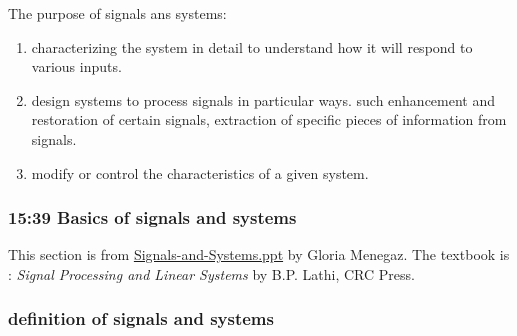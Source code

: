 \documentclass[koma,utopia,letterpaper,captions=tableheading,11pt,listings-sv,microtype,paralist,colorlinks=true,urlcolor=blue]{org-article}
\begin{document}
The purpose of signals ans systems:
\begin{enumerate}
\item characterizing the system in detail to understand how it will respond to
various inputs.
\item design systems to process signals in particular ways. such enhancement and
restoration of certain signals, extraction of specific pieces of information
from signals.
\item modify or control the characteristics of a given system.
\end{enumerate}


\subsubsection{15:39 Basics of signals and systems}
\label{sec:org42860fe}


This section is from \href{http://www.di.univr.it/documenti/OccorrenzaIns/matdid/matdid744681.pdf}{Signals-and-Systems.ppt}  by Gloria Menegaz. The textbook
is : \emph{Signal Processing and Linear Systems} by B.P. Lathi, CRC Press.

\subsubsection{definition of signals and systems}
\label{sec:org785eae1}
\end{document}
